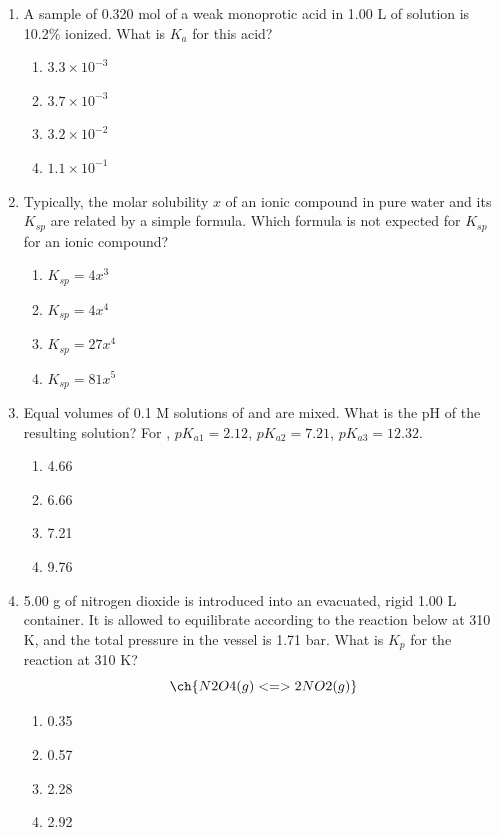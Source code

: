 \documentclass[twocolumn, 10pt]{article}
\begin{document}
\begin{enumerate}
    \item A sample of 0.320 mol of a weak monoprotic acid in 1.00 L of solution is 10.2\% ionized. What is $K_a$ for this acid?
    \begin{enumerate}
        \item $3.3 \times 10^{-3}$
        \item $3.7 \times 10^{-3}$
        \item $3.2 \times 10^{-2}$
        \item $1.1 \times 10^{-1}$
    \end{enumerate}

    \item Typically, the molar solubility $x$ of an ionic compound in pure water and its $K_{sp}$ are related by a simple formula. Which formula is not expected for $K_{sp}$ for an ionic compound?
    \begin{enumerate}
        \item $K_{sp} = 4x^3$
        \item $K_{sp} = 4x^4$
        \item $K_{sp} = 27x^4$
        \item $K_{sp} = 81x^5$
    \end{enumerate}

    \item Equal volumes of 0.1 M solutions of  and  are mixed. What is the pH of the resulting solution? For , $pK_{a1} = 2.12$, $pK_{a2} = 7.21$, $pK_{a3} = 12.32$.
    \begin{enumerate}
        \item 4.66
        \item 6.66
        \item 7.21
        \item 9.76
    \end{enumerate}

    \item 5.00 g of nitrogen dioxide is introduced into an evacuated, rigid 1.00 L container. It is allowed to equilibrate according to the reaction below at 310 K, and the total pressure in the vessel is 1.71 bar. What is $K_p$ for the reaction at 310 K?
    \[ \ch{N2O4(g) <=> 2NO2(g)} \]
    \begin{enumerate}
        \item 0.35
        \item 0.57
        \item 2.28
        \item 2.92
    \end{enumerate}


\end{enumerate}
\end{document}
